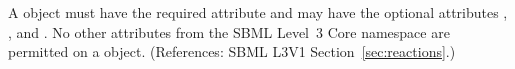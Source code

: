 A \ModifierSpeciesReference object must have the required attribute
 and may have the optional attributes ,
,  and .  No other attributes from the
SBML Level~3 Core namespace are permitted on a \ModifierSpeciesReference
object.  (References: SBML L3V1 Section~\ref{sec:reactions}.)
